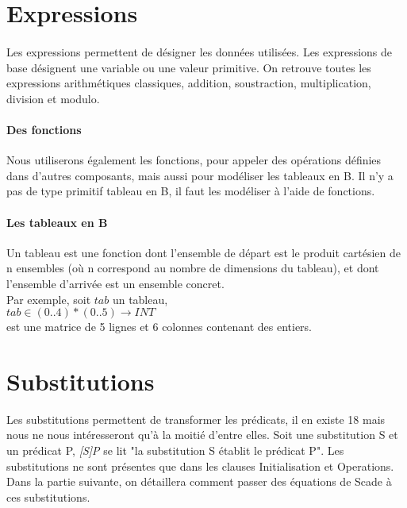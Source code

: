 \section{Expressions}

\paragraph{}
Les expressions permettent de désigner les données utilisées. Les
expressions de base désignent une variable ou une valeur primitive.
On retrouve toutes les expressions arithmétiques classiques, addition,
soustraction, multiplication, division et modulo.

\paragraph{Des fonctions}

Nous utiliserons également les fonctions, pour appeler des opérations
définies dans d'autres composants, mais aussi pour modéliser les
tableaux en B. Il n'y a pas de type primitif tableau en B, il faut les
modéliser à l'aide de fonctions.

\paragraph{Les tableaux en B}
Un tableau est une fonction dont l'ensemble de départ est le produit
cartésien de n ensembles (où n correspond au nombre de dimensions du
tableau), et dont l'ensemble d'arrivée est un ensemble concret.\\
Par exemple, soit $tab$ un tableau, \\
$tab \in (0..4)*(0..5) \rightarrow INT$ \\
est une matrice de 5 lignes et 6 colonnes contenant des entiers.



\section{Substitutions}
Les substitutions permettent de transformer les prédicats, il en existe 18 mais
nous ne nous intéresseront qu'à la moitié d'entre elles. Soit une substitution S et un
prédicat P, \emph{[S]P} se lit "la substitution S établit le prédicat P".
Les substitutions ne sont présentes que dans les clauses Initialisation et
Operations. Dans la partie suivante, on détaillera comment passer des équations
de Scade à ces substitutions.

